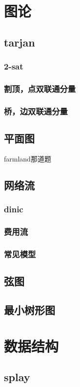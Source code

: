 \documentclass[landscape]{report}
\newcommand{\includecode}[2][c]{}
\begin{document}
\begin{flushleft}
\begin{multicols}{2}
\includecode[c++]{cash.cpp}
\chapter{ 图论}
\section{ tarjan}
\subsection{ 2-sat}
\subsection{ 割顶，点双联通分量}
\subsection{ 桥，边双联通分量}
\section{ 平面图}
farmland那道题
\section{网络流}
\subsection{ dinic}
\subsection{ 费用流}
\subsection{ 常见模型}
\section{弦图}
\section{最小树形图}


\chapter{数据结构}
\section{splay}

\end{multicols}
\end{flushleft}
\end{document}
